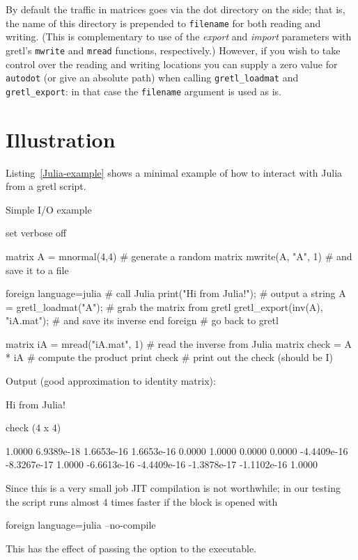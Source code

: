 By default the traffic in matrices goes via the dot directory on the
 side; that is, the name of this directory is prepended to
\texttt{filename} for both reading and writing. (This is complementary
to use of the \textsl{export} and \textsl{import} parameters with
gretl's \texttt{mwrite} and \texttt{mread} functions, respectively.)
However, if you wish to take control over the reading and writing
locations you can supply a zero value for \texttt{autodot} (or give an
absolute path) when calling \verb|gretl_loadmat| and
\verb|gretl_export|: in that case the \texttt{filename} argument is
used as is.

\section{Illustration}

Listing~\ref{Julia-example} shows a minimal example of how to interact
with Julia from a gretl script.

\begin{script}[htbp]
  \caption{Simple  I/O example}
  \label{Julia-example}
\begin{scode}
set verbose off

matrix A = mnormal(4,4)                # generate a random matrix
mwrite(A, "A", 1)                      # and save it to a file

foreign language=julia                 # call Julia
    print("Hi from Julia!\n");         # output a string
    A = gretl_loadmat("A");            # grab the matrix from gretl
    gretl_export(inv(A), "iA.mat");    # and save its inverse
end foreign                            # go back to gretl

matrix iA = mread("iA.mat", 1)         # read the inverse from Julia
matrix check = A * iA                  # compute the product
print check                            # print out the check (should be I)
\end{scode}
Output (good approximation to identity matrix):
\begin{code}
Hi from Julia!

check (4 x 4)

      1.0000   6.9389e-18   1.6653e-16   1.6653e-16 
      0.0000       1.0000       0.0000       0.0000 
 -4.4409e-16  -8.3267e-17       1.0000  -6.6613e-16 
 -4.4409e-16  -1.3878e-17  -1.1102e-16       1.0000 
\end{code}
\scriptURL
\end{script}

Since this is a very small job JIT compilation is not worthwhile; in
our testing the script runs almost 4 times faster if the 
block is opened with
\begin{code}
foreign language=julia --no-compile
\end{code}
This has the effect of passing the option  to the
 executable.



